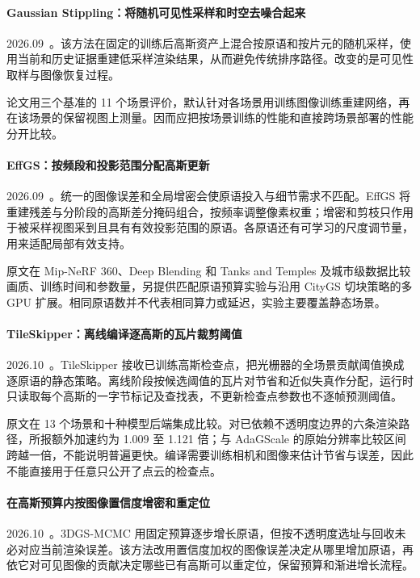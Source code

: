 \paragraph{Gaussian Stippling：将随机可见性采样和时空去噪合起来}
2026.09~\cite{2609_38488}。该方法在固定的训练后高斯资产上混合按原语和按片元的随机采样，使用当前和历史证据重建低采样渲染结果，从而避免传统排序路径。改变的是可见性取样与图像恢复过程。

论文用三个基准的 11 个场景评价，默认针对各场景用训练图像训练重建网络，再在该场景的保留视图上测量。因而应把按场景训练的性能和直接跨场景部署的性能分开比较。

\paragraph{EffGS：按频段和投影范围分配高斯更新}
2026.09~\cite{2609_39553}。统一的图像误差和全局增密会使原语投入与细节需求不匹配。EffGS 将重建残差与分阶段的高斯差分掩码组合，按频率调整像素权重；增密和剪枝只作用于被采样视图采到且具有有效投影范围的原语。各原语还有可学习的尺度调节量，用来适配局部有效支持。

原文在 Mip-NeRF 360、Deep Blending 和 Tanks and Temples 及城市级数据比较画质、训练时间和参数量，另提供匹配原语预算实验与沿用 CityGS 切块策略的多 GPU 扩展。相同原语数并不代表相同算力或延迟，实验主要覆盖静态场景。

\paragraph{TileSkipper：离线编译逐高斯的瓦片裁剪阈值}
2026.10~\cite{2610_09343}。TileSkipper 接收已训练高斯检查点，把光栅器的全场景贡献阈值换成逐原语的静态策略。离线阶段按候选阈值的瓦片对节省和近似失真作分配，运行时只读取每个高斯的一字节标记及查找表，不更新检查点参数也不逐帧预测阈值。

原文在 13 个场景和十种模型后端集成比较。对已依赖不透明度边界的六条渲染路径，所报额外加速约为 1.009 至 1.121 倍；与 AdaGScale 的原始分辨率比较区间跨越一倍，不能说明普遍更快。编译需要训练相机和图像来估计节省与误差，因此不能直接用于任意只公开了点云的检查点。

\paragraph{在高斯预算内按图像置信度增密和重定位}
2026.10~\cite{2610_13541}。3DGS-MCMC 用固定预算逐步增长原语，但按不透明度选址与回收未必对应当前渲染误差。该方法改用置信度加权的图像误差决定从哪里增加原语，再依它对可见图像的贡献决定哪些已有高斯可以重定位，保留预算和渐进增长流程。

